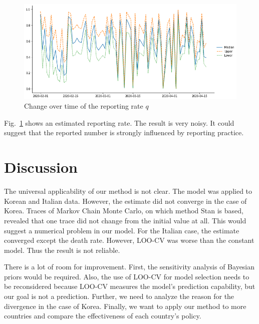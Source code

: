 \documentclass{amsart}
\begin{document}
\begin{figure}[h]
 \centering
 \includegraphics[width=\linewidth]{fig/q-Japan.png}
 \caption{Change over time of the reporting rate $q$}
 \label{fig:q}
\end{figure}

Fig.~\ref{fig:q} shows an estimated reporting rate.
The result is very noisy.
It could suggest that the reported number is strongly influenced by reporting practice.

\section{Discussion}

The universal applicability of our method is not clear.
The model was applied to Korean and Italian data.
However, the estimate did not converge in the case of Korea.
Traces of Markov Chain Monte Carlo, on which method Stan is based, revealed that one trace did not change from the initial value at all.
This would suggest a numerical problem in our model.
For the Italian case, the estimate converged except the death rate.
However, LOO-CV was worse than the constant model. Thus the result is not reliable.

There is a lot of room for improvement.
First, the sensitivity analysis of Bayesian priors would be required.
Also, the use of LOO-CV for model selection needs to be reconsidered because LOO-CV measures the model's prediction capability, but our goal is not a prediction.
Further, we need to analyze the reason for the divergence in the case of Korea.
Finally, we want to apply our method to more countries and compare the effectiveness of each country's policy. 



\end{document}

